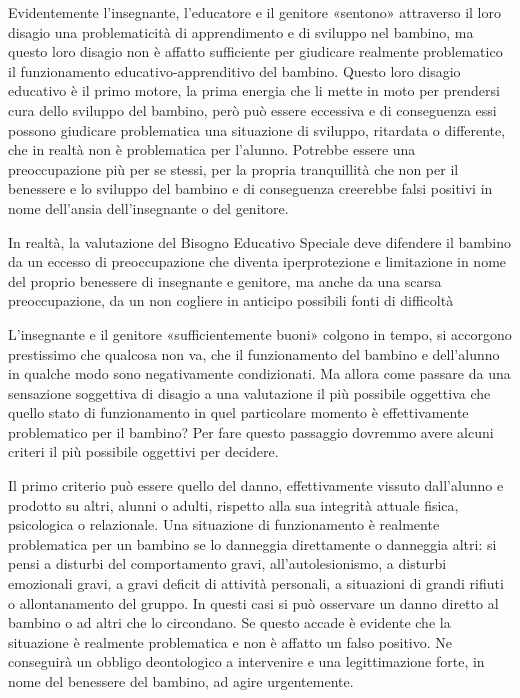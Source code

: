 Evidentemente l'insegnante, l'educatore e il genitore «sentono» attraverso il loro disagio una
problematicità di apprendimento e di sviluppo nel bambino, ma questo loro disagio non è affatto
sufficiente per giudicare realmente problematico il funzionamento educativo-apprenditivo del
bambino. Questo loro disagio educativo è il primo motore, la prima energia che li mette in moto
per prendersi cura dello sviluppo del bambino, però può essere eccessiva e di conseguenza essi
possono giudicare problematica una situazione di sviluppo, ritardata o differente, che in realtà non
è problematica per l'alunno. Potrebbe essere una preoccupazione più per se stessi, per la propria
tranquillità che non per il benessere e lo sviluppo del bambino e di conseguenza creerebbe falsi
positivi in nome dell'ansia dell'insegnante o del genitore.

In realtà, la valutazione del Bisogno Educativo Speciale deve difendere il bambino da un
eccesso di preoccupazione che diventa iperprotezione e limitazione in nome del proprio benessere
di insegnante e genitore, ma anche da una scarsa preoccupazione, da un non cogliere in anticipo
possibili fonti di difficoltà

L'insegnante e il genitore «sufficientemente buoni» colgono in tempo, si accorgono
prestissimo che qualcosa non va, che il funzionamento del bambino e dell'alunno in qualche modo
sono negativamente condizionati. Ma allora come passare da una sensazione soggettiva di disagio
a una valutazione il più possibile oggettiva che quello stato di funzionamento in quel particolare
momento è effettivamente problematico per il bambino? Per fare questo passaggio dovremmo
avere alcuni criteri il più possibile oggettivi per decidere.

Il primo criterio può essere quello del danno, effettivamente vissuto dall'alunno e prodotto su
altri, alunni o adulti, rispetto alla sua integrità attuale fisica, psicologica o relazionale. Una
situazione di funzionamento è realmente problematica per un bambino se lo danneggia
direttamente o danneggia altri: si pensi a disturbi del comportamento gravi, all'autolesionismo, a
disturbi emozionali gravi, a gravi deficit di attività personali, a situazioni di grandi rifiuti o
allontanamento del gruppo. In questi casi si può osservare un danno diretto al bambino o ad altri che lo circondano. Se questo accade è evidente che la situazione è realmente problematica e non è
affatto un falso positivo. Ne conseguirà un obbligo deontologico a intervenire e una legittimazione
forte, in nome del benessere del bambino, ad agire urgentemente.


